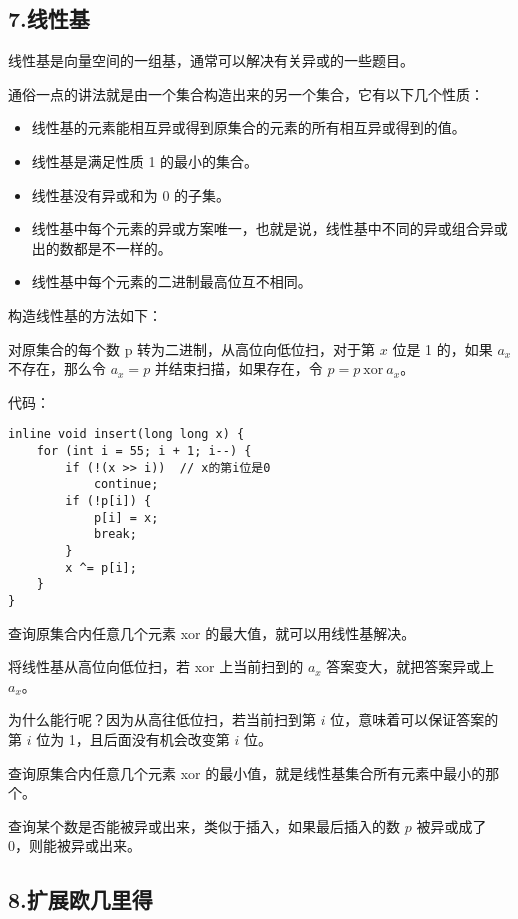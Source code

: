\documentclass[]{article}
\begin{document}
\hypertarget{ux7ebfux6027ux57fa}{%
\subsection{7.线性基}\label{ux7ebfux6027ux57fa}}

线性基是向量空间的一组基，通常可以解决有关异或的一些题目。

通俗一点的讲法就是由一个集合构造出来的另一个集合，它有以下几个性质：

\begin{itemize}
\item
  线性基的元素能相互异或得到原集合的元素的所有相互异或得到的值。
\item
  线性基是满足性质 1 的最小的集合。
\item
  线性基没有异或和为 0 的子集。
\item
  线性基中每个元素的异或方案唯一，也就是说，线性基中不同的异或组合异或出的数都是不一样的。
\item
  线性基中每个元素的二进制最高位互不相同。
\end{itemize}

构造线性基的方法如下：

对原集合的每个数 p 转为二进制，从高位向低位扫，对于第 \(x\) 位是 1
的，如果 \(a_x\) 不存在，那么令 \(a_x=p\) 并结束扫描，如果存在，令
\(p=p~\text{xor}~a_x\)。

代码：

\begin{verbatim}
inline void insert(long long x) {
    for (int i = 55; i + 1; i--) {
        if (!(x >> i))  // x的第i位是0
            continue;
        if (!p[i]) {
            p[i] = x;
            break;
        }
        x ^= p[i];
    }
}
\end{verbatim}

查询原集合内任意几个元素 xor 的最大值，就可以用线性基解决。

将线性基从高位向低位扫，若 xor 上当前扫到的 \(a_x\)
答案变大，就把答案异或上 \(a_x\)。

为什么能行呢？因为从高往低位扫，若当前扫到第 \(i\)
位，意味着可以保证答案的第 \(i\) 位为 1，且后面没有机会改变第 \(i\) 位。

查询原集合内任意几个元素 xor
的最小值，就是线性基集合所有元素中最小的那个。

查询某个数是否能被异或出来，类似于插入，如果最后插入的数 \(p\)
被异或成了 0，则能被异或出来。

\hypertarget{ux6269ux5c55ux6b27ux51e0ux91ccux5f97}{%
\subsection{8.扩展欧几里得}\label{ux6269ux5c55ux6b27ux51e0ux91ccux5f97}}
\end{document}
